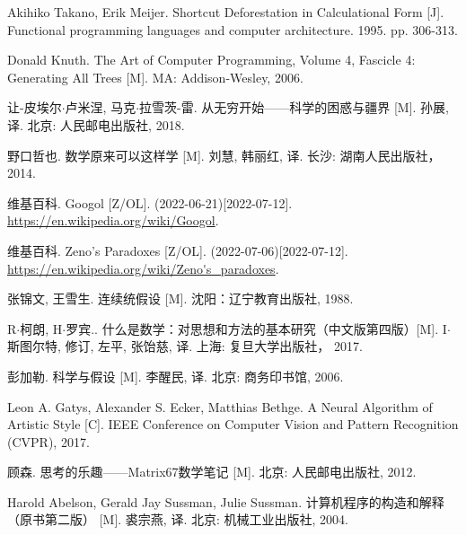 \documentclass[UTF8]{article}
\begin{document}
\begin{thebibliography}{99}
Akihiko Takano, Erik Meijer. Shortcut Deforestation in Calculational Form [J]. Functional programming languages and computer architecture. 1995. pp. 306-313.

Donald Knuth. The Art of Computer Programming, Volume 4, Fascicle 4: Generating All Trees [M]. MA: Addison-Wesley, 2006. %

让-皮埃尔$\cdot$卢米涅, 马克$\cdot$拉雪茨-雷. 从无穷开始——科学的困惑与疆界 [M]. 孙展, 译. 北京: 人民邮电出版社, 2018. %

野口哲也. 数学原来可以这样学 [M]. 刘慧, 韩丽红, 译. 长沙: 湖南人民出版社， 2014. %

维基百科. Googol [Z/OL]. (2022-06-21)[2022-07-12]. \url{https://en.wikipedia.org/wiki/Googol}.

维基百科. Zeno's Paradoxes [Z/OL]. (2022-07-06)[2022-07-12]. \url{https://en.wikipedia.org/wiki/Zeno's_paradoxes}.

张锦文, 王雪生. 连续统假设 [M]. 沈阳：辽宁教育出版社, 1988. %

R$\cdot$柯朗, H$\cdot$罗宾.. 什么是数学：对思想和方法的基本研究（中文版第四版）[M]. I$\cdot$斯图尔特, 修订, 左平, 张饴慈, 译. 上海: 复旦大学出版社， 2017. %


彭加勒. 科学与假设 [M]. 李醒民, 译. 北京: 商务印书馆, 2006. %

Leon A. Gatys, Alexander S. Ecker, Matthias Bethge. A Neural Algorithm of Artistic Style [C]. IEEE Conference on Computer Vision and Pattern Recognition (CVPR), 2017.

顾森. 思考的乐趣——Matrix67数学笔记 [M]. 北京: 人民邮电出版社, 2012. %

Harold Abelson, Gerald Jay Sussman, Julie Sussman. 计算机程序的构造和解释（原书第二版） [M]. 裘宗燕, 译. 北京: 机械工业出版社, 2004. %


\end{thebibliography}
\end{document}
